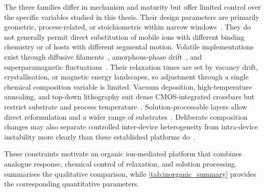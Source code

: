 \documentclass[12pt, twoside]{report}
\begin{document}
The three families differ in mechanism and maturity but offer limited control over the specific variables studied in this thesis. Their design parameters are primarily geometric, process-related, or stoichiometric within narrow windows~\cite{IelminiWong2018, Sun2019, Sangwan2020}. They do not generally permit direct substitution of mobile ions with different binding chemistry or of hosts with different segmental motion. Volatile implementations exist through diffusive filaments~\cite{Du2017, Midya2019, Zhong2021, Ohno2011}, amorphous-phase drift~\cite{Sebastian2014}, and superparamagnetic fluctuations~\cite{Mizrahi2018}. Their relaxation times are set by vacancy drift, crystallisation, or magnetic energy landscapes, so adjustment through a single chemical composition variable is limited. Vacuum deposition, high-temperature annealing, and top-down lithography suit dense CMOS-integrated crossbars but restrict substrate and process temperature~\cite{Wong2010, Prezioso2015, Ambrogio2018}. Solution-processable layers allow direct reformulation and a wider range of substrates~\cite{Sangwan2020}. Deliberate composition changes may also separate controlled inter-device heterogeneity from intra-device instability more clearly than these established platforms do~\cite{Sun2019, Sebastian2014, IelminiWong2018,Tanaka2019}.

These constraints motivate an organic ion-mediated platform that combines analogue response, chemical control of relaxation, and solution processing.  summarises the qualitative comparison, while \cref{tab:inorganic_summary} provides the corresponding quantitative parameters.
\end{document}
